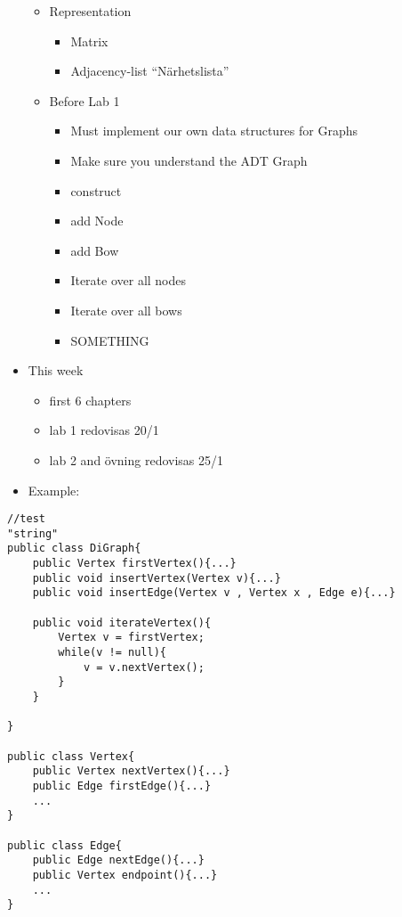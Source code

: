 \documentclass[11pt]{amsart}
\begin{document}
\begin{itemize}
\begin{itemize}
	
	\item Representation
		\begin{itemize}
		\item Matrix
		\item Adjacency-list ``N\"{a}rhetslista''
		\end{itemize}
	\item Before Lab 1
		\begin{itemize}
		\item Must implement our own data structures for Graphs
		\item Make sure you understand the ADT Graph
		\item construct
		\item add Node
		\item add Bow
		\item Iterate over all nodes
		\item Iterate over all bows
		\item SOMETHING
		\end{itemize}
	\end{itemize}
\item This week
	\begin{itemize}
	\item first 6 chapters
	\item lab 1 redovisas 20/1
	\item lab 2 and \"{o}vning redovisas 25/1
	\end{itemize}
\item Example:
\end{itemize}

\begin{lstlisting}
//test
"string"
public class DiGraph{
	public Vertex firstVertex(){...}
	public void insertVertex(Vertex v){...}
	public void insertEdge(Vertex v , Vertex x , Edge e){...}
	
	public void iterateVertex(){
		Vertex v = firstVertex;
		while(v != null){
			v = v.nextVertex();
		}
	}
	
}

public class Vertex{
	public Vertex nextVertex(){...}
	public Edge firstEdge(){...}
	...
}

public class Edge{
	public Edge nextEdge(){...}
	public Vertex endpoint(){...}
	...
}
\end{lstlisting}
\end{document}
